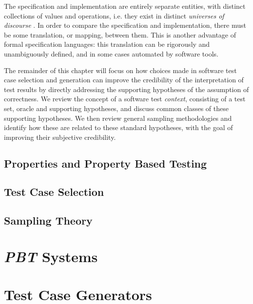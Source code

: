 \documentclass[11pt]{report}
\newcommand{\pbt}{\textit{PBT}\xspace}
\begin{document}
The specification and implementation are entirely separate entities,
with distinct collections of values and operations,
i.e. they exist in distinct \emph{universes of discourse} \cite{boole_laws}.
In order to compare the specification and implementation,
there must be some translation, or mapping, between them.
This is another advantage of formal specification languages:
this translation can be rigorously and unambiguously defined,
and in some cases automated by software tools.

The remainder of this chapter will focus on
how choices made in software test case selection and generation
can improve the credibility of the interpretation of test results
by directly addressing the supporting hypotheses of the assumption of correctness.
We review the concept of a software test \emph{context},
consisting of a test set, oracle and supporting hypotheses,
and discuss common classes of these supporting hypotheses.
We then review general sampling methodologies and
identify how these are related to these standard hypotheses,
with the goal of improving their subjective credibility.

\section{Properties and Property Based Testing}\label{pbt}


\section{Test Case Selection}\label{swtest}


\section{Sampling Theory}\label{sec:sampling_theory}


\setcounter{figure}{0}
\setcounter{equation}{0}
\setcounter{table}{0}

\chapter{\pbt Systems}\label{pbtsystems}


\setcounter{figure}{0}
\setcounter{equation}{0}
\setcounter{table}{0}
\chapter{Test Case Generators}\label{chp:testgen}
\end{document}
